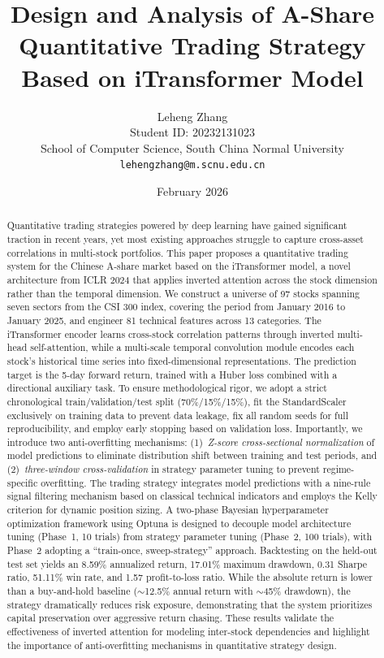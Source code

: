 \documentclass[12pt, a4paper]{article}
\title{\textbf{Design and Analysis of A-Share Quantitative Trading Strategy Based on iTransformer Model}}
\author{
  Leheng Zhang \\
  Student ID: 20232131023 \\
  School of Computer Science, South China Normal University \\
  \texttt{lehengzhang@m.scnu.edu.cn}
}
\date{February 2026}
\begin{document}
\maketitle

\begin{abstract}
Quantitative trading strategies powered by deep learning have gained significant traction in recent years, yet most existing approaches struggle to capture cross-asset correlations in multi-stock portfolios. This paper proposes a quantitative trading system for the Chinese A-share market based on the iTransformer model, a novel architecture from ICLR 2024 that applies inverted attention across the stock dimension rather than the temporal dimension. We construct a universe of 97 stocks spanning seven sectors from the CSI 300 index, covering the period from January 2016 to January 2025, and engineer 81 technical features across 13 categories. The iTransformer encoder learns cross-stock correlation patterns through inverted multi-head self-attention, while a multi-scale temporal convolution module encodes each stock's historical time series into fixed-dimensional representations. The prediction target is the 5-day forward return, trained with a Huber loss combined with a directional auxiliary task. To ensure methodological rigor, we adopt a strict chronological train/validation/test split (70\%/15\%/15\%), fit the StandardScaler exclusively on training data to prevent data leakage, fix all random seeds for full reproducibility, and employ early stopping based on validation loss. Importantly, we introduce two anti-overfitting mechanisms: (1)~\emph{Z-score cross-sectional normalization} of model predictions to eliminate distribution shift between training and test periods, and (2)~\emph{three-window cross-validation} in strategy parameter tuning to prevent regime-specific overfitting. The trading strategy integrates model predictions with a nine-rule signal filtering mechanism based on classical technical indicators and employs the Kelly criterion for dynamic position sizing. A two-phase Bayesian hyperparameter optimization framework using Optuna is designed to decouple model architecture tuning (Phase~1, 10 trials) from strategy parameter tuning (Phase~2, 100 trials), with Phase~2 adopting a ``train-once, sweep-strategy'' approach. Backtesting on the held-out test set yields an 8.59\% annualized return, 17.01\% maximum drawdown, 0.31 Sharpe ratio, 51.11\% win rate, and 1.57 profit-to-loss ratio. While the absolute return is lower than a buy-and-hold baseline ($\sim$12.5\% annual return with $\sim$45\% drawdown), the strategy dramatically reduces risk exposure, demonstrating that the system prioritizes capital preservation over aggressive return chasing. These results validate the effectiveness of inverted attention for modeling inter-stock dependencies and highlight the importance of anti-overfitting mechanisms in quantitative strategy design.
\end{abstract}
\end{document}
